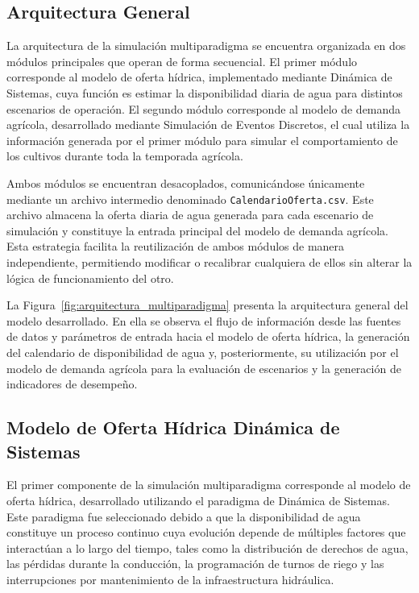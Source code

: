 \documentclass[12pt]{report}
\begin{document}
\subsection{Arquitectura General}

La arquitectura de la simulación multiparadigma se encuentra organizada en dos módulos principales que operan de forma secuencial. El primer módulo corresponde al modelo de oferta hídrica, implementado mediante Dinámica de Sistemas, cuya función es estimar la disponibilidad diaria de agua para distintos escenarios de operación. El segundo módulo corresponde al modelo de demanda agrícola, desarrollado mediante Simulación de Eventos Discretos, el cual utiliza la información generada por el primer módulo para simular el comportamiento de los cultivos durante toda la temporada agrícola.

Ambos módulos se encuentran desacoplados, comunicándose únicamente mediante un archivo intermedio denominado \texttt{CalendarioOferta.csv}. Este archivo almacena la oferta diaria de agua generada para cada escenario de simulación y constituye la entrada principal del modelo de demanda agrícola. Esta estrategia facilita la reutilización de ambos módulos de manera independiente, permitiendo modificar o recalibrar cualquiera de ellos sin alterar la lógica de funcionamiento del otro.

La Figura~\ref{fig:arquitectura_multiparadigma} presenta la arquitectura general del modelo desarrollado. En ella se observa el flujo de información desde las fuentes de datos y parámetros de entrada hacia el modelo de oferta hídrica, la generación del calendario de disponibilidad de agua y, posteriormente, su utilización por el modelo de demanda agrícola para la evaluación de escenarios y la generación de indicadores de desempeño.


\subsection{Modelo de Oferta Hídrica Dinámica de Sistemas}

El primer componente de la simulación multiparadigma corresponde al modelo de oferta hídrica, desarrollado utilizando el paradigma de Dinámica de Sistemas. Este paradigma fue seleccionado debido a que la disponibilidad de agua constituye un proceso continuo cuya evolución depende de múltiples factores que interactúan a lo largo del tiempo, tales como la distribución de derechos de agua, las pérdidas durante la conducción, la programación de turnos de riego y las interrupciones por mantenimiento de la infraestructura hidráulica.
\end{document}
